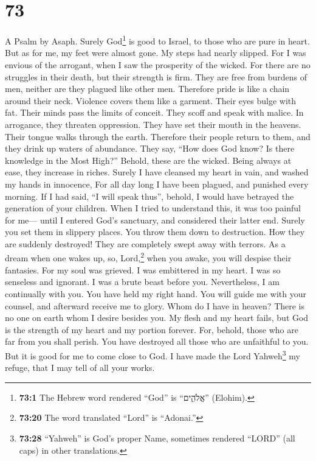 \hypertarget{section-71}{%
\section{73}\label{section-71}}

A Psalm by Asaph.  Surely God\footnote{\textbf{73:1} The
  Hebrew word rendered ``God'' is ``אֱלֹהִ֑ים'' (Elohim).} is good to
Israel, to those who are pure in heart.  But as for me, my
feet were almost gone. My steps had nearly slipped.  For I
was envious of the arrogant, when I saw the prosperity of the wicked.
 For there are no struggles in their death, but their
strength is firm.  They are free from burdens of men,
neither are they plagued like other men.  Therefore pride
is like a chain around their neck. Violence covers them like a garment.
 Their eyes bulge with fat. Their minds pass the limits of
conceit.  They scoff and speak with malice. In arrogance,
they threaten oppression.  They have set their mouth in
the heavens. Their tongue walks through the earth. 
Therefore their people return to them, and they drink up waters of
abundance.  They say, ``How does God know? Is there
knowledge in the Most High?''  Behold, these are the
wicked. Being always at ease, they increase in riches. 
Surely I have cleansed my heart in vain, and washed my hands in
innocence,  For all day long I have been plagued, and
punished every morning.  If I had said, ``I will speak
thus'', behold, I would have betrayed the generation of your children.
 When I tried to understand this, it was too painful for
me---  until I entered God's sanctuary, and considered
their latter end.  Surely you set them in slippery
places. You throw them down to destruction.  How they are
suddenly destroyed! They are completely swept away with terrors.
 As a dream when one wakes up, so, Lord,\footnote{\textbf{73:20}
  The word translated ``Lord'' is ``Adonai.''} when you awake, you will
despise their fantasies.  For my soul was grieved. I was
embittered in my heart.  I was so senseless and ignorant.
I was a brute beast before you.  Nevertheless, I am
continually with you. You have held my right hand.  You
will guide me with your counsel, and afterward receive me to glory.
 Whom do I have in heaven? There is no one on earth whom
I desire besides you.  My flesh and my heart fails, but
God is the strength of my heart and my portion forever. 
For, behold, those who are far from you shall perish. You have destroyed
all those who are unfaithful to you.  But it is good for
me to come close to God. I have made the Lord Yahweh\footnote{\textbf{73:28}
  ``Yahweh'' is God's proper Name, sometimes rendered ``LORD'' (all
  caps) in other translations.} my refuge, that I may tell of all your
works.

